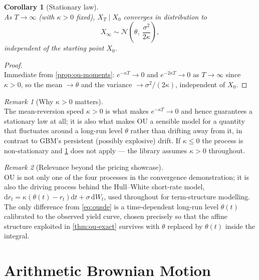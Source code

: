 \documentclass[11pt]{report}
\newcommand{\dd}{\mathrm{d}}
\newcommand{\dW}{\dd W_t}
\newcommand{\dt}{\dd t}
\theoremstyle{plain}
\newtheorem{corollary}{Corollary}[chapter]
\theoremstyle{definition}
\theoremstyle{remark}
\newtheorem{remark}{Remark}[chapter]
\numberwithin{equation}{chapter}
\begin{document}
\begin{corollary}[Stationary law]\label{cor:ou-stationary}
  \leavevmode\\
As $T\to\infty$ (with $\kappa>0$ fixed), $X_T\mid X_0$ converges in
distribution to
\[
   X_\infty \sim \mathcal N\!\left(\theta,\ \frac{\sigma^2}{2\kappa}\right),
\]
independent of the starting point $X_0$.
\end{corollary}

\begin{proof}
  \leavevmode\\
Immediate from \cref{prop:ou-moments}: $e^{-\kappa T}\to 0$ and
$e^{-2\kappa T}\to 0$ as $T\to\infty$ since $\kappa>0$, so the mean
$\to\theta$ and the variance $\to\sigma^2/(2\kappa)$, independent of
$X_0$.
\end{proof}

\begin{remark}[Why $\kappa>0$ matters]
  \leavevmode\\
The mean-reversion speed $\kappa>0$ is what makes $e^{-\kappa T}\to0$
and hence guarantees a stationary law at all; it is also what makes OU
a sensible model for a quantity that fluctuates around a long-run
level $\theta$ rather than drifting away from it, in contrast to GBM's
persistent (possibly explosive) drift. If $\kappa\le0$ the process is
non-stationary and \cref{cor:ou-stationary} does not apply --- the
library assumes $\kappa>0$ throughout.
\end{remark}

\begin{remark}[Relevance beyond the pricing showcase]
  \leavevmode\\
OU is not only one of the four processes in the convergence
demonstration; it is also the driving process behind the Hull--White
short-rate model, $\dd r_t = \kappa(\theta(t)-r_t)\dt+\sigma\,\dW$,
used throughout  for term-structure
modelling. The only difference from \eqref{eq:ousde} is a
time-dependent long-run level $\theta(t)$ calibrated to the observed
yield curve, chosen precisely so that the affine structure exploited in
\cref{thm:ou-exact} survives with $\theta$ replaced by $\theta(t)$
inside the integral.
\end{remark}

\chapter{Arithmetic Brownian Motion}
\end{document}
